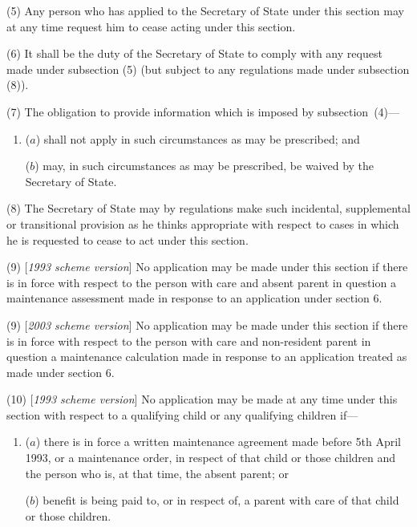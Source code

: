 \documentclass[12pt,a4paper]{article}
\begin{document}
(5) Any person who has applied to the Secretary of State under this section may at any time request him to cease acting under this section.

(6) It shall be the duty of the Secretary of State to comply with any request made under subsection (5)  (but subject to any regulations made under subsection (8)).

(7) The obligation to provide information which is imposed by subsection~(4)—
\begin{enumerate}\item[]
($a$) shall not apply in such circumstances as may be prescribed; and

($b$) may, in such circumstances as may be prescribed, be waived by the Secretary of State.
\end{enumerate}

(8) The Secretary of State may by regulations make such incidental, supplemental or transitional provision as he thinks appropriate with respect to cases in which he is requested to cease to act under this section.

(9) [\emph{1993 scheme version}] No application may be made under this section if there is in force with respect to the person with care and absent parent in question a maintenance assessment made in response to an application under section 6.

(9) [\emph{2003 scheme version}] No application may be made under this section if there is in force with respect to the person with care and 
non-resident parent  %
in question a 
maintenance calculation  %
made in response to an application 
treated as made  %
under section 6.

(10) [\emph{1993 scheme version}] No application may be made at any time under this section with respect to a qualifying child or any qualifying children if—
\begin{enumerate}\item[]
($a$) there is in force a written maintenance agreement made before 5th April 1993, or a maintenance order, in respect of that child or those children and the person who is, at that time, the absent parent; or

($b$) benefit is being paid to, or in respect of, a parent with care of that child or 
those children.
\end{enumerate}
\end{document}
